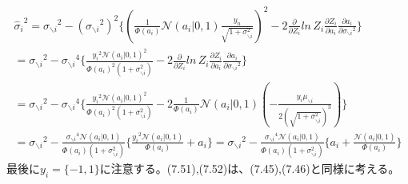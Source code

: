 \documentclass{jsarticle}
\begin{document}
\begin{equation}
\begin{split}
{\hat{\sigma}_i}^2 = {\sigma_{\backslash i}}^2 - ({\sigma_{\backslash i}}^2)^2\{ (\frac{1}{\Phi(a_i)} \mathcal{N}(a_i | 0, 1) \frac{y_n}{\sqrt{1 + \sigma_{\backslash i}^2}})^2 - 2 \frac{\partial}{\partial Z_i} ln \, Z_i \frac{\partial Z_i}{\partial a_i}\frac{\partial a_i}{\partial {\sigma_{\backslash i}}^2}\}\\
= {\sigma_{\backslash i}}^2 - {\sigma_{\backslash i}}^4\{ \frac{{y_i}^2\mathcal{N}(a_i | 0, 1)^2}{\Phi(a_i)^2(1 + \sigma_{\backslash i}^2)} - 2 \frac{\partial}{\partial Z_i} ln \, Z_i \frac{\partial Z_i}{\partial a_i}\frac{\partial a_i}{\partial {\sigma_{\backslash i}}^2}\}\\
= {\sigma_{\backslash i}}^2 - {\sigma_{\backslash i}}^4\{ \frac{{y_i}^2\mathcal{N}(a_i | 0, 1)^2}{\Phi(a_i)^2(1 + \sigma_{\backslash i}^2)} - 2 \frac{1}{\Phi(a_i)} \mathcal{N}(a_i | 0, 1)(-\frac{y_i \mu_{\backslash i}}{2(\sqrt{1 + \sigma_{\backslash i}^2})^3})\}\\
= {\sigma_{\backslash i}}^2 - \frac{{\sigma_{\backslash i}}^4 \mathcal{N}(a_i | 0, 1)}{\Phi(a_i)(1 + \sigma_{\backslash i}^2)}\{ \frac{{y_i}^2\mathcal{N}(a_i | 0, 1)}{\Phi(a_i)} + a_i\}
= {\sigma_{\backslash i}}^2 - \frac{{\sigma_{\backslash i}}^4 \mathcal{N}(a_i | 0, 1)}{\Phi(a_i)(1 + \sigma_{\backslash i}^2)}\{ a_i + \frac{\mathcal{N}(a_i | 0, 1)}{\Phi(a_i)}\}
\end{split}
\end{equation}
最後に$y_i = \{ -1, 1\}$に注意する。(7.51),(7.52)は、(7.45),(7.46)と同様に考える。
\end{document}

